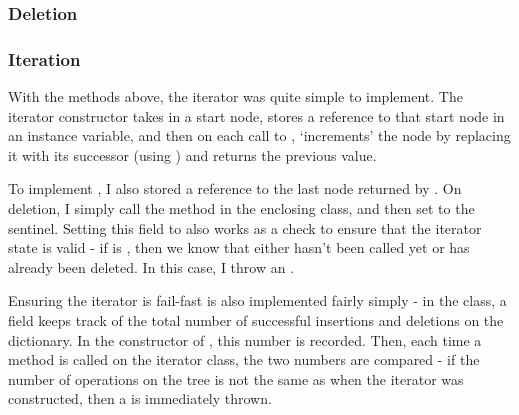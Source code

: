 \subsubsection{Deletion}

\subsubsection{Iteration}

With the methods above, the iterator was quite simple to implement. The iterator constructor takes in a start node, stores a reference to that start node in an instance variable, and then on each call to , `increments' the node by replacing it with its successor (using ) and returns the previous value.

To implement , I also stored a reference to the last node returned by . On deletion, I simply call the  method in the enclosing  class, and then set  to the  sentinel. Setting this field to  also works as a check to ensure that the iterator state is valid - if  is , then we know that either  hasn't been called yet or  has already been deleted. In this case, I throw an .

Ensuring the iterator is fail-fast is also implemented fairly simply - in the  class, a field  keeps track of the total number of successful insertions and deletions on the dictionary. In the constructor of , this number is recorded. Then, each time a method is called on the iterator class, the two numbers are compared - if the number of operations on the tree is not the same as when the iterator was constructed, then a  is immediately thrown.